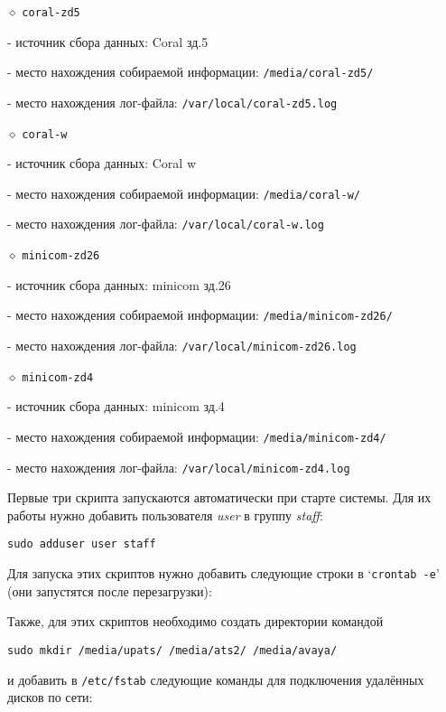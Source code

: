 \noindent $\diamond$ {\tt coral-zd5}
\item{} - источник сбора данных: Coral зд.5
\item{} - место нахождения собираемой информации: {\tt /media/coral-zd5/}
\item{} - место нахождения лог-файла: {\tt /var/local/coral-zd5.log}
\bigskip

\noindent $\diamond$ {\tt coral-w}
\item{} - источник сбора данных: Coral w
\item{} - место нахождения собираемой информации: {\tt /media/coral-w/}
\item{} - место нахождения лог-файла: {\tt /var/local/coral-w.log}
\bigskip

\noindent $\diamond$ {\tt minicom-zd26}
\item{} - источник сбора данных: minicom зд.26
\item{} - место нахождения собираемой информации: {\tt /media/minicom-zd26/}
\item{} - место нахождения лог-файла: {\tt /var/local/minicom-zd26.log}
\bigskip

\noindent $\diamond$ {\tt minicom-zd4}
\item{} - источник сбора данных: minicom зд.4
\item{} - место нахождения собираемой информации: {\tt /media/minicom-zd4/}
\item{} - место нахождения лог-файла: {\tt /var/local/minicom-zd4.log}
\bigskip

\noindent
Первые три скрипта запускаются автоматически при старте системы.
Для их работы нужно добавить пользователя {\sl user\/} в
группу {\sl staff\/}: \hfil\break
\centerline{\tt sudo adduser user staff}
\medskip

\noindent
Для запуска этих скриптов нужно добавить следующие строки в `{\tt crontab -e}'
(они запустятся после перезагрузки): \hfil\break
{} \hfil\break
{} \hfil\break
{} \par
\medskip

\noindent
Также, для этих скриптов необходимо создать директории командой \hfil\break
\centerline{\tt sudo mkdir /media/upats/ /media/ats2/ /media/avaya/}
и добавить в {\tt /etc/fstab} следующие команды для подключения удалённых дисков
по сети: \par
{} \hfil\break
{} \hfil\break
{}\par
\medskip

